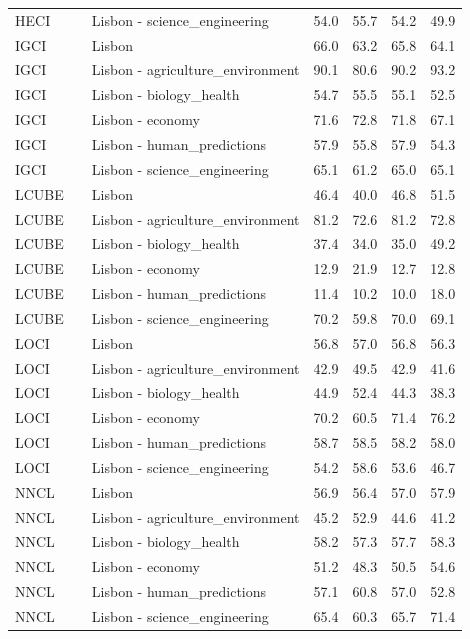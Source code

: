 \begin{tabular}{lllllll}
HECI &  & Lisbon - science\_engineering & 54.0 & 55.7 & 54.2 & 49.9 \\
IGCI &  & Lisbon & 66.0 & 63.2 & 65.8 & 64.1 \\
IGCI &  & Lisbon - agriculture\_environment & 90.1 & 80.6 & 90.2 & 93.2 \\
IGCI &  & Lisbon - biology\_health & 54.7 & 55.5 & 55.1 & 52.5 \\
IGCI &  & Lisbon - economy & 71.6 & 72.8 & 71.8 & 67.1 \\
IGCI &  & Lisbon - human\_predictions & 57.9 & 55.8 & 57.9 & 54.3 \\
IGCI &  & Lisbon - science\_engineering & 65.1 & 61.2 & 65.0 & 65.1 \\
LCUBE &  & Lisbon & 46.4 & 40.0 & 46.8 & 51.5 \\
LCUBE &  & Lisbon - agriculture\_environment & 81.2 & 72.6 & 81.2 & 72.8 \\
LCUBE &  & Lisbon - biology\_health & 37.4 & 34.0 & 35.0 & 49.2 \\
LCUBE &  & Lisbon - economy & 12.9 & 21.9 & 12.7 & 12.8 \\
LCUBE &  & Lisbon - human\_predictions & 11.4 & 10.2 & 10.0 & 18.0 \\
LCUBE &  & Lisbon - science\_engineering & 70.2 & 59.8 & 70.0 & 69.1 \\
LOCI &  & Lisbon & 56.8 & 57.0 & 56.8 & 56.3 \\
LOCI &  & Lisbon - agriculture\_environment & 42.9 & 49.5 & 42.9 & 41.6 \\
LOCI &  & Lisbon - biology\_health & 44.9 & 52.4 & 44.3 & 38.3 \\
LOCI &  & Lisbon - economy & 70.2 & 60.5 & 71.4 & 76.2 \\
LOCI &  & Lisbon - human\_predictions & 58.7 & 58.5 & 58.2 & 58.0 \\
LOCI &  & Lisbon - science\_engineering & 54.2 & 58.6 & 53.6 & 46.7 \\
NNCL &  & Lisbon & 56.9 & 56.4 & 57.0 & 57.9 \\
NNCL &  & Lisbon - agriculture\_environment & 45.2 & 52.9 & 44.6 & 41.2 \\
NNCL &  & Lisbon - biology\_health & 58.2 & 57.3 & 57.7 & 58.3 \\
NNCL &  & Lisbon - economy & 51.2 & 48.3 & 50.5 & 54.6 \\
NNCL &  & Lisbon - human\_predictions & 57.1 & 60.8 & 57.0 & 52.8 \\
NNCL &  & Lisbon - science\_engineering & 65.4 & 60.3 & 65.7 & 71.4 \\

\end{tabular}
